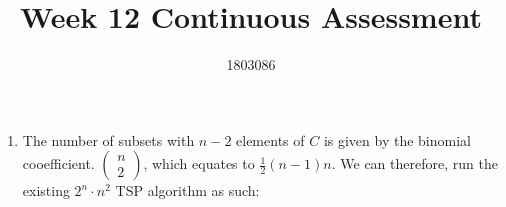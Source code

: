 \documentclass{article}
\title{Week 12 Continuous Assessment}
\author{1803086}
\begin{document}
\maketitle
\begin{enumerate}
  \item

%

%
%

        The number of subsets with $n-2$ elements of $C$ is given by the binomial cooefficient. $\begin{pmatrix}
          n \\ 2
        \end{pmatrix}$, which equates to $\frac{1}{2}(n-1)n$. We can therefore, run the existing $2^{n} \cdot n^{2}$ TSP algorithm as such:


\end{enumerate}
\end{document}
